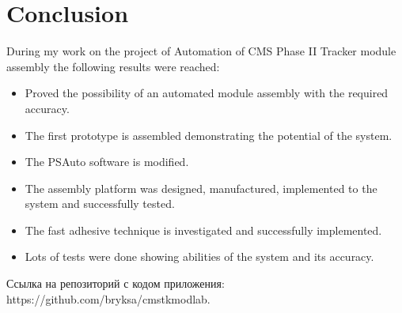 \chapter{Conclusion}

During my work on the project of Automation of CMS Phase II Tracker module assembly the following results were reached:

\begin{itemize}
\item Proved the possibility of an automated module assembly with the required accuracy.
\item The first prototype is assembled demonstrating the potential of the system.
\item The PSAuto software is modified.
\item The assembly platform was designed, manufactured, implemented to the system and successfully tested.
\item The fast adhesive technique is investigated and successfully implemented.
\item Lots of tests were done showing abilities of the system and its accuracy.

\end{itemize}

Ссылка на репозиторий с кодом приложения: https://github.com/bryksa/cmstkmodlab.




